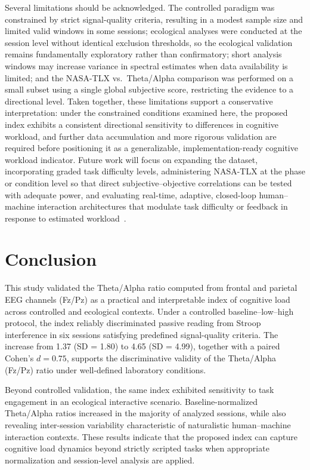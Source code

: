 \documentclass[conference]{IEEEtran}
\begin{document}
Several limitations should be acknowledged. The controlled paradigm was constrained by strict signal-quality criteria, resulting in a modest sample size and limited valid windows in some sessions; ecological analyses were conducted at the session level without identical exclusion thresholds, so the ecological validation remains fundamentally exploratory rather than confirmatory; short analysis windows may increase variance in spectral estimates when data availability is limited; and the NASA-TLX vs.\ Theta/Alpha comparison was performed on a small subset using a single global subjective score, restricting the evidence to a directional level. Taken together, these limitations support a conservative interpretation: under the constrained conditions examined here, the proposed index exhibits a consistent directional sensitivity to differences in cognitive workload, and further data accumulation and more rigorous validation are required before positioning it as a generalizable, implementation-ready cognitive workload indicator. Future work will focus on expanding the dataset, incorporating graded task difficulty levels, administering NASA-TLX at the phase or condition level so that direct subjective--objective correlations can be tested with adequate power, and evaluating real-time, adaptive, closed-loop human--machine interaction architectures that modulate task difficulty or feedback in response to estimated workload~\cite{c10}.


\section{Conclusion}

This study validated the Theta/Alpha ratio computed from frontal and parietal EEG channels (Fz/Pz) as a practical and interpretable index of cognitive load across controlled and ecological contexts. Under a controlled baseline--low--high protocol, the index reliably discriminated passive reading from Stroop interference in six sessions satisfying predefined signal-quality criteria. The increase from 1.37 (SD = 1.80) to 4.65 (SD = 4.99), together with a paired Cohen’s $d = 0.75$, supports the discriminative validity of the Theta/Alpha (Fz/Pz) ratio under well-defined laboratory conditions.

Beyond controlled validation, the same index exhibited sensitivity to task engagement in an ecological interactive scenario. Baseline-normalized Theta/Alpha ratios increased in the majority of analyzed sessions, while also revealing inter-session variability characteristic of naturalistic human--machine interaction contexts. These results indicate that the proposed index can capture cognitive load dynamics beyond strictly scripted tasks when appropriate normalization and session-level analysis are applied.
\end{document}
